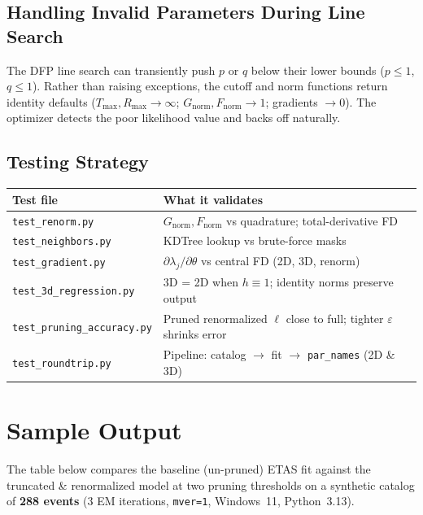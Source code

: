 \documentclass[11pt,a4paper]{article}
\theoremstyle{plain}
\theoremstyle{definition}
\newcommand{\eps}{\varepsilon}
\newcommand{\Gnorm}{G_{\mathrm{norm}}}
\newcommand{\Fnorm}{F_{\mathrm{norm}}}
\newcommand{\Tmax}{T_{\max}}
\newcommand{\Rmax}{R_{\max}}
\begin{document}
\subsection{Handling Invalid Parameters During Line Search}

The DFP line search can transiently push $p$ or $q$ below their lower bounds
($p\le 1$, $q\le 1$). Rather than raising exceptions, the cutoff and norm
functions return identity defaults ($\Tmax,\Rmax\to\infty$;
$\Gnorm,\Fnorm\to 1$; gradients $\to 0$). The optimizer detects the poor
likelihood value and backs off naturally.

\subsection{Testing Strategy}

\begin{center}
\begin{tabular}{@{}ll@{}}
\toprule
Test file & What it validates\\
\midrule
\texttt{test\_renorm.py}          & $\Gnorm,\Fnorm$ vs quadrature; total-derivative FD\\
\texttt{test\_neighbors.py}       & KDTree lookup vs brute-force masks\\
\texttt{test\_gradient.py}        & $\partial\lambda_j/\partial\theta$ vs central FD (2D, 3D, renorm)\\
\texttt{test\_3d\_regression.py}  & 3D = 2D when $h\equiv 1$; identity norms preserve output\\
\texttt{test\_pruning\_accuracy.py}& Pruned renormalized $\ell$ close to full; tighter $\eps$ shrinks error\\
\texttt{test\_roundtrip.py}       & Pipeline: catalog $\to$ fit $\to$ \texttt{par\_names} (2D \& 3D)\\
\bottomrule
\end{tabular}
\end{center}

\section{Sample Output}\label{sec:output}

The table below compares the baseline (un-pruned) ETAS fit against the
truncated \& renormalized model at two pruning thresholds on a synthetic
catalog of \textbf{288 events} (3 EM iterations, \texttt{mver=1}, Windows~11,
Python~3.13).
\end{document}
